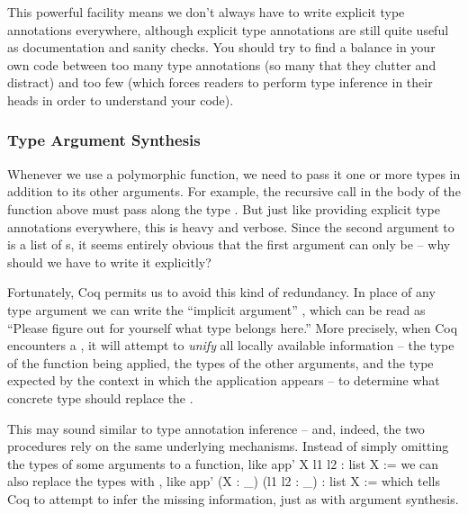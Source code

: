 \documentclass[12pt]{report}
\begin{document}
    This powerful facility means we don't always have to write
    explicit type annotations everywhere, although explicit type
    annotations are still quite useful as documentation and sanity
    checks.  You should try to find a balance in your own code between
    too many type annotations (so many that they clutter and distract)
    and too few (which forces readers to perform type inference in
    their heads in order to understand your code). \begin{coqdoccode}
\coqdocemptyline
\end{coqdoccode}
\subsubsection{Type Argument Synthesis}



 Whenever we use a polymorphic function, we need to pass it
    one or more types in addition to its other arguments.  For
    example, the recursive call in the body of the  function
    above must pass along the type .  But just like providing
    explicit type annotations everywhere, this is heavy and verbose.
    Since the second argument to  is a list of s, it seems
    entirely obvious that the first argument can only be  -- why
    should we have to write it explicitly?


    Fortunately, Coq permits us to avoid this kind of redundancy.  In
    place of any type argument we can write the ``implicit argument''
    \coqdocvar{\_}, which can be read as ``Please figure out for yourself what
    type belongs here.''  More precisely, when Coq encounters a \coqdocvar{\_}, it
    will attempt to \textit{unify} all locally available information -- the
    type of the function being applied, the types of the other
    arguments, and the type expected by the context in which the
    application appears -- to determine what concrete type should
    replace the \coqdocvar{\_}.


    This may sound similar to type annotation inference -- and,
    indeed, the two procedures rely on the same underlying mechanisms.
    Instead of simply omitting the types of some arguments to a
    function, like
      app' X l1 l2 : list X :=
    we can also replace the types with \coqdocvar{\_}, like
      app' (X : \_) (l1 l2 : \_) : list X :=
    which tells Coq to attempt to infer the missing information, just
    as with argument synthesis.
\end{document}
